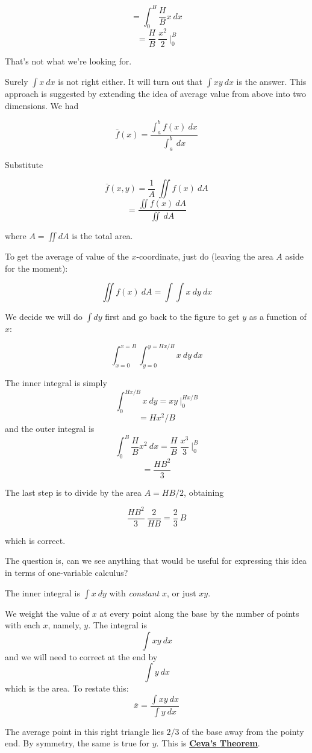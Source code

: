 \documentclass[11pt, oneside]{article}
\begin{document}
\[ = \int_0^B \frac{H}{B} x \ dx \]
\[ = \frac{H}{B} \ \frac{x^2}{2} \ \bigg |_0^B \]

That's not what we're looking for.

Surely $\int x \ dx$ is not right either.  It will turn out that $\int xy \ dx$ is the answer.  This approach is suggested by extending the idea of average value from above into two dimensions.  We had

\[ \bar{f}(x) = \frac{\int_a^b f(x) \ dx}{\int_a^b \ dx}  \]

Substitute

\[ \bar{f}(x,y) = \frac{1}{A} \ \iint f(x) \ dA \]
\[ = \frac{\iint f(x) \ dA}{\iint \ dA} \]

where $A = \iint dA$ is the total area.

To get the average of value of the $x$-coordinate, just do (leaving the area $A$ aside for the moment):

\[ \iint f(x) \ dA = \int \int x \ dy \ dx \]

We decide we will do $\int dy$ first and go back to the figure to get $y$ as a function of $x$:

\[  \int_{x=0}^{x=B} \int_{y=0}^{y=Hx/B} x \ dy \ dx \]

The inner integral is simply
\[ \int_{0}^{Hx/B} x \ dy = xy \ \bigg |_{0}^{Hx/B}  \]
\[ = Hx^2/B \]
and the outer integral is
\[ \int_{0}^{B} \frac{H}{B} x^2 \ dx =  \frac{H}{B} \ \frac{x^3}{3}  \ \bigg |_{0}^{B}  \]
\[ = \frac{HB^2}{3}  \]

The last step is to divide by the area $A = HB/2$, obtaining 

\[ \frac{HB^2}{3} \ \frac{2}{HB} = \frac{2}{3} \ B  \]

which is correct.

The question is, can we see anything that would be useful for expressing this idea in terms of one-variable calculus?

The inner integral is $\int x \ dy$ with \emph{constant} $x$, or just $xy$.

We weight the value of $x$ at every point along the base by the number of points with each $x$, namely, $y$.  The integral is
\[ \int xy \ dx \]
and we will need to correct at the end by
\[ \int y \ dx \]
which is the area.  To restate this:
\[ \bar{x} = \frac{ \int xy \ dx}{\int y \ dx} \]

The average point in this right triangle lies $2/3$ of the base away from the pointy end.  By symmetry, the same is true for $y$.  This is \hyperref[sec:Ceva]{\textbf{Ceva's Theorem}}.
\end{document}
